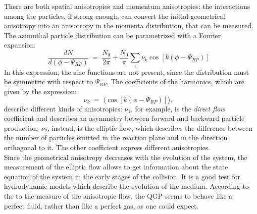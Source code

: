 %
There are both spatial anisotropies and momentum anisotropies: the interactions among the particles, if strong enough, can convert the initial geometrical anisotropy into an anisotropy in the momenta distribution, that can be measured.\\
The azimuthal particle distribution can be parametrized with a Fourier expansion:
\begin{equation}
 \frac{dN}{d(\phi-\Psi_{RP})}\;=\;\frac{N_{0}}{2\pi} + \frac{N_{0}}{\pi}\sum_{z} \nu_{k}\cos[k(\phi-\Psi_{RP})]
\end{equation}
In this expression, the sine functions are not present, since the distribution must be symmetric with respect to $\Psi_{RP}$.
The coefficients of the harmonics, which are given by the expression:
\begin{equation}
 \nu_{k}\;=\;\langle \cos[k(\phi-\Psi_{RP})]\rangle,
\end{equation}
describe different kinds of anisotropies: $\nu_{1}$, for example, is the \textit{direct flow} coefficient and describes an asymmetry between forward and backward particle production; $\nu_{2}$, instead, is the elliptic flow, which describes the difference between the number of particles emitted in the reaction plane and in the direction orthogonal to it. The other coefficient express different anisotropies.\\
Since the geometrical anisotropy decreases with the evolution of the system, the measurement of the elliptic flow allows to get information about the state equation of the system in the early stages of the collision. It is a good test for hydrodynamic models which describe the evolution of the medium. According to the to the measure of the anisotropic flow, the QGP seems to behave like a perfect fluid, rather than like a perfect gas, as one could expect.
%


